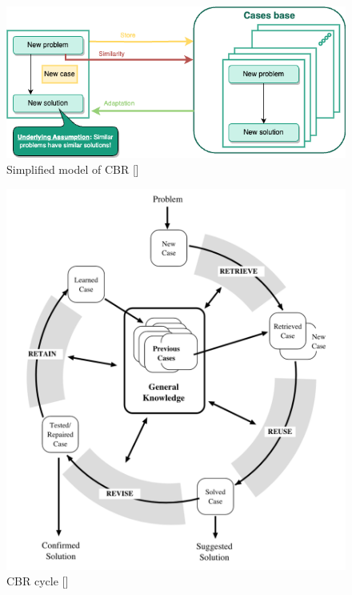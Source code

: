     \begin{figure}[H]
    \centering
    \includegraphics[width=\textwidth]{images/Concept-simplified-cbr-Simplified CBR princip.drawio.png}
    \caption{\label{fig:simple-cbr}  Simplified model of CBR []}
    \end{figure}
    
    \begin{figure}[H]
    \centering
    \includegraphics[scale=0.6]{images/Concept-cbr-cycle.png}
    \caption{\label{fig:cbr-cycle}  CBR cycle []}
    \end{figure}
    

